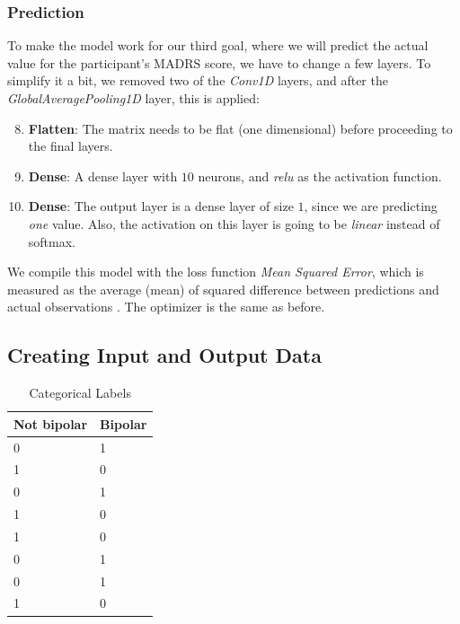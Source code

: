 \subsubsection{Prediction}
To make the model work for our third goal, where we will predict the actual value for the participant's MADRS score, we have to change a few layers.
To simplify it a bit, we removed two of the \textit{Conv1D} layers, and after the \textit{GlobalAveragePooling1D} layer, this is applied:

\begin{enumerate}
      \setcounter{enumi}{7}
      \item \textbf{Flatten}: The matrix needs to be flat (one dimensional) before proceeding to the final layers.
      \item \textbf{Dense}: A dense layer with $10$ neurons, and \textit{relu} as the activation function. 
      \item \textbf{Dense}: The output layer is a dense layer of size $1$, since we are predicting \textit{one} value. 
            Also, the activation on this layer is going to be \textit{linear} instead of softmax.
\end{enumerate}

We compile this model with the loss function \textit{Mean Squared Error}, which is measured as the average (mean) 
of squared difference between predictions and actual observations \cite{loss_functions}. The optimizer is the same as before.

\subsection{Creating Input and Output Data}
\begin{table}
  \begin{center}
    \begin{tabular}{| l | l |}
      \hline
      \textbf{Not bipolar} & \textbf{Bipolar}  \\ \hline
      0                    &  1                \\ \hline
      1                    &  0                \\ \hline
      0                    &  1                \\ \hline
      1                    &  0                \\ \hline
      1                    &  0                \\ \hline
      0                    &  1                \\ \hline
      0                    &  1                \\ \hline
      1                    &  0                \\ \hline
    \end{tabular}
    \caption{Categorical Labels}
    \label{table:categorical_labels}
  \end{center}
\end{table}

